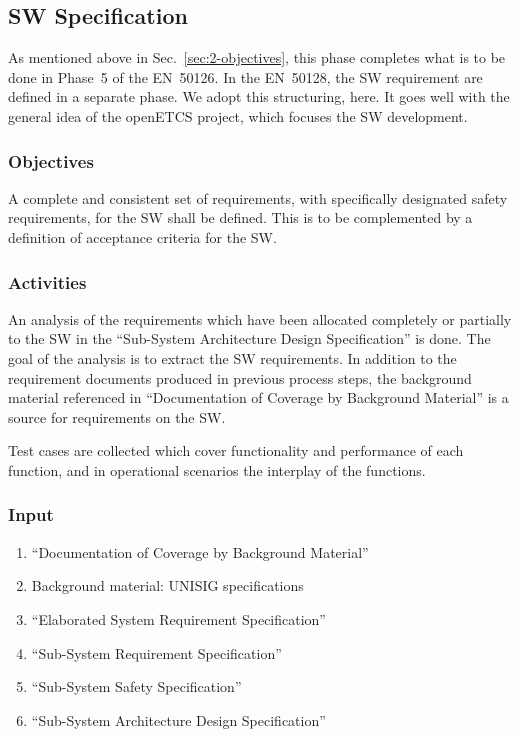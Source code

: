 \documentclass{template/openetcs_article}
\begin{document}
\subsection{SW Specification}
\label{sec:software-requirements}

As mentioned above in Sec.~\ref{sec:2-objectives}, this phase
completes what is to be done in Phase~5 of the EN~50126. In the
EN~50128, the SW requirement are defined in a separate phase. We
adopt this structuring, here. It goes well with the general idea of
the openETCS project, which focuses the SW development.  

\subsubsection{Objectives}
\label{sec:3-objectives}
A complete and consistent set of requirements, with specifically
designated safety requirements, for the SW shall be defined. This is
to be complemented by a definition of acceptance criteria for the SW. 


\subsubsection{Activities}
\label{sec:3-activities}

An analysis of the requirements which have been allocated completely
or partially to the SW in the ``Sub-System Architecture Design
Specification'' is done. The goal of the analysis is to extract the SW
requirements. In addition to the requirement documents produced in
previous process steps, the background material referenced in
``Documentation of Coverage by Background Material'' is a source for
requirements on the SW. 

Test cases are collected which cover functionality and performance of
each function, and in operational scenarios the interplay of the
functions.

\subsubsection{Input}
\label{sec:3-input}

\begin{enumerate}
\item ``Documentation of Coverage by Background Material''
\item Background material: UNISIG specifications
\item ``Elaborated System Requirement Specification''
\item ``Sub-System Requirement Specification''
\item ``Sub-System Safety Specification''
\item ``Sub-System Architecture Design Specification''
\end{enumerate}
\end{document}
